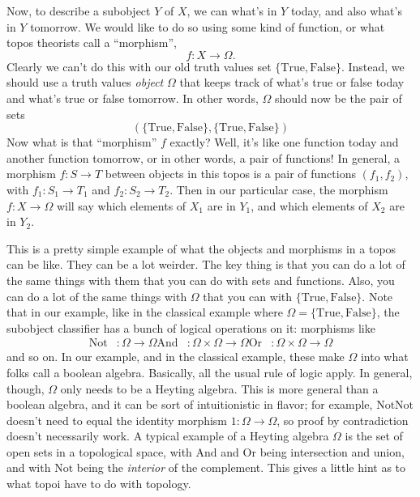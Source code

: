 \documentclass{article}
\begin{document}
Now, to describe a subobject \(Y\) of \(X\), we can what's in \(Y\)
today, and also what's in \(Y\) tomorrow. We would like to do so using
some kind of function, or what topos theorists call a ``morphism'',
\[f: X \to \Omega.\] Clearly we can't do this with our old truth values
set \(\{\mathrm{True},\mathrm{False}\}\). Instead, we should use a truth
values \emph{object} \(\Omega\) that keeps track of what's true or false
today and what's true or false tomorrow. In other words, \(\Omega\)
should now be the pair of sets
\[(\{\mathrm{True}, \mathrm{False}\}, \{\mathrm{True}, \mathrm{False}\})\]
Now what is that ``morphism'' \(f\) exactly? Well, it's like one
function today and another function tomorrow, or in other words, a pair
of functions! In general, a morphism \(f\colon S \to T\) between objects
in this topos is a pair of functions \((f_1,f_2)\), with
\(f_1\colon S_1 \to T_1\) and \(f_2\colon S_2 \to T_2\). Then in our
particular case, the morphism \(f\colon X \to \Omega\) will say which
elements of \(X_1\) are in \(Y_1\), and which elements of \(X_2\) are in
\(Y_2\).

This is a pretty simple example of what the objects and morphisms in a
topos can be like. They can be a lot weirder. The key thing is that you
can do a lot of the same things with them that you can do with sets and
functions. Also, you can do a lot of the same things with \(\Omega\)
that you can with \(\{\mathrm{True}, \mathrm{False}\}\). Note that in
our example, like in the classical example where
\(\Omega = \{\mathrm{True}, \mathrm{False}\}\), the subobject classifier
has a bunch of logical operations on it: morphisms like \[
  \begin{aligned}
    \mathrm{Not}&\colon \Omega \to \Omega
    \mathrm{And}&\colon \Omega \times \Omega \to \Omega
    \mathrm{Or}&\colon \Omega \times \Omega \to \Omega
  \end{aligned}
\] and so on. In our example, and in the classical example, these make
\(\Omega\) into what folks call a boolean algebra. Basically, all the
usual rule of logic apply. In general, though, \(\Omega\) only needs to
be a Heyting algebra. This is more general than a boolean algebra, and
it can be sort of intuitionistic in flavor; for example,
\(\mathrm{Not} \mathrm{Not}\) doesn't need to equal the identity
morphism \(1\colon \Omega \to \Omega\), so proof by contradiction
doesn't necessarily work. A typical example of a Heyting algebra
\(\Omega\) is the set of open sets in a topological space, with
\(\mathrm{And}\) and \(\mathrm{Or}\) being intersection and union, and
with \(\mathrm{Not}\) being the \emph{interior} of the complement. This
gives a little hint as to what topoi have to do with topology.
\end{document}
